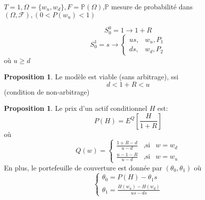 \documentclass{article}
\theoremstyle{plain}
\theoremstyle{definition}
\newtheorem{propos}[thm]{Proposition}
\begin{document}
$T=1,\Omega=\{w_u,w_d\},F=\mathbb{P}(\Omega)$,$\mathbb{P}$ mesure de probabilit\'e dans $(\Omega,\mathcal{F}),(0<P(w_u)<1)$

\begin{equation}
S_0^0=1\rightarrow 1+R
\end{equation}
\begin{equation}
S_0^1=s\rightarrow
\left\{\begin{array}{rc}
	us, &w_u,P_1\\
	ds, &w_d, P_2
\end{array}\right.
\end{equation}
o\`u $u \geq d$

\begin{propos}
	Le mod\`ele est viable (sans arbitrage), ssi
	\begin{equation}
	d<1+R<u
	\end{equation}
	(condition de non-arbitrage)
\end{propos}

\begin{propos}
	Le prix d'un actif conditionnel $H$ est:
	\begin{equation}
P(H)=E^Q[\frac{H}{1+R}]
\end{equation} 
o\`u
\begin{equation}
Q(w) = \left\{\begin{array}{rcl}
	\frac{1+R-d}{u-d} & ,\text{si} &w=w_d\\
	\frac{u-1-R}{u-d} & ,\text{si} &w=w_u
\end{array} \right.
\end{equation}
En plus, le portefeuille de couverture est donn\'ee par $(\theta_0,\theta_1)$ o\`u 
\begin{equation}
	\left\{\begin{array}{rc}
		\theta_0=P(H)-\theta_1 s\\
		\theta_1=\frac{H(w_u)-H(w_d)}{us-ds}
	\end{array}\right.
\end{equation}
\end{propos}
\end{document}
